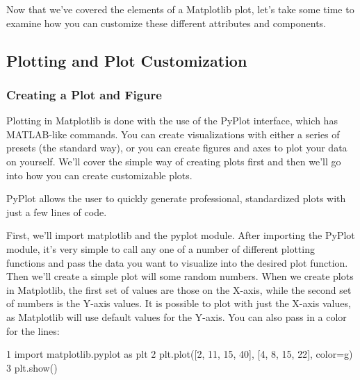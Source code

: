 \documentclass[11pt]{article}
\newenvironment{Shaded}{}{}
\newcommand{\DecValTok}[1]{\textcolor[rgb]{0.25,0.63,0.44}{{#1}}}
\newcommand{\StringTok}[1]{\textcolor[rgb]{0.25,0.44,0.63}{{#1}}}
\newcommand{\NormalTok}[1]{{#1}}
\newcommand{\ImportTok}[1]{{#1}}
\newcommand{\OperatorTok}[1]{\textcolor[rgb]{0.40,0.40,0.40}{{#1}}}
\begin{document}
Now that we've covered the elements of a Matplotlib plot, let's take
some time to examine how you can customize these different attributes
and components.

\subsection{Plotting and Plot
Customization}\label{plotting-and-plot-customization}

\subsubsection{Creating a Plot and
Figure}\label{creating-a-plot-and-figure}

Plotting in Matplotlib is done with the use of the PyPlot interface,
which has MATLAB-like commands. You can create visualizations with
either a series of presets (the standard way), or you can create figures
and axes to plot your data on yourself. We'll cover the simple way of
creating plots first and then we'll go into how you can create
customizable plots.

PyPlot allows the user to quickly generate professional, standardized
plots with just a few lines of code.

First, we'll import matplotlib and the pyplot module. After importing
the PyPlot module, it's very simple to call any one of a number of
different plotting functions and pass the data you want to visualize
into the desired plot function. Then we'll create a simple plot will
some random numbers. When we create plots in Matplotlib, the first set
of values are those on the X-axis, while the second set of numbers is
the Y-axis values. It is possible to plot with just the X-axis values,
as Matplotlib will use default values for the Y-axis. You can also pass
in a color for the lines:

\begin{Shaded}
\begin{Highlighting}[]
    \DecValTok{1} \ImportTok{import}\NormalTok{ matplotlib.pyplot }\ImportTok{as}\NormalTok{ plt}
    \DecValTok{2}\NormalTok{ plt.plot([}\DecValTok{2}\NormalTok{, }\DecValTok{11}\NormalTok{, }\DecValTok{15}\NormalTok{, }\DecValTok{40}\NormalTok{], [}\DecValTok{4}\NormalTok{, }\DecValTok{8}\NormalTok{, }\DecValTok{15}\NormalTok{, }\DecValTok{22}\NormalTok{], color}\OperatorTok{=}\StringTok{\textquotesingle{}g\textquotesingle{}}\NormalTok{)}
    \DecValTok{3}\NormalTok{ plt.show()}
\end{Highlighting}
\end{Shaded}
\end{document}
